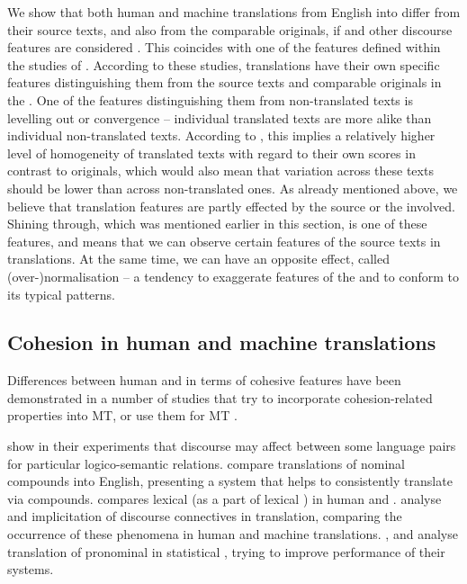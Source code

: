 \documentclass[output=paper]{langsci/langscibook.cls}
\begin{document}
We show that both human and machine translations from English into  differ from their source texts, and also from the comparable  originals, if  and other discourse features are considered \citep{Lapshinova2015Disco} . This coincides with one of the features defined within the studies of  \citep[see][]{Gellerstam:1986,Baker1993}. According to these studies, translations have their own specific features distinguishing them from the source texts and comparable originals in the . One of the features distinguishing them from non-translated texts is {\sc levelling out} or {\sc convergence} \citep{Laviosa:2002} -- individual translated texts are more alike than individual non-translated texts. According to \citet{Laviosa:2002}, this implies a relatively higher level of homogeneity of translated texts with regard to their own scores in contrast to originals, which would also mean that variation across these texts should be lower than across non-translated ones.
As already mentioned above, we believe that translation features are partly effected by the source or the  involved. Shining through, which was mentioned earlier in this section, is one of these features, and means that we can observe certain features of the source texts in translations. At the same time, we can have an opposite effect, called (over-){\sc normalisation} -- a tendency to exaggerate features of the  and to conform to its typical patterns.

\subsection{Cohesion in human and machine translations}\label{sec:cohesionHTMT}

Differences between human and  in terms of cohesive features have been demonstrated in a number of studies that try to incorporate cohesion-related properties into MT, or use them for MT .

\citet{LiEtAl2014ACL} show in their experiments that discourse  may affect  between some language pairs for particular logico-semantic relations. \citet{MascarellEtAl2014} compare translations of  nominal compounds into English, presenting a system that helps to consistently translate  via compounds.  \citet{Guillou2013} compares lexical  (as a part of lexical ) in human and . \citet{MeyerWebber2013} analyse  and implicitation of discourse connectives in translation, comparing the occurrence of these phenomena in human and machine translations. \citet{Hardmeier2012discourse}, \citet{Guillou2012} and \citet{Hardmeier2014} analyse translation of pronominal  in statistical , trying to improve performance of their systems.
\end{document}
